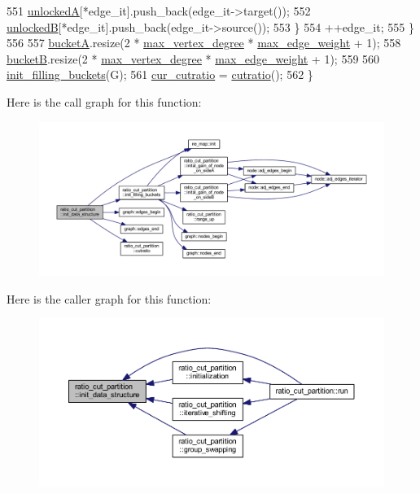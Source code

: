 \begin{DoxyCode}
551         \mbox{\hyperlink{classratio__cut__partition_a9e4d0ba86475bd0faa98e01c6be4dde0}{unlockedA}}[*edge\_it].push\_back(edge\_it->target());
552         \mbox{\hyperlink{classratio__cut__partition_af7c877d8c6e9b533ab34cde1c6690b25}{unlockedB}}[*edge\_it].push\_back(edge\_it->source());
553     \}
554     ++edge\_it;
555     \}
556 
557     \mbox{\hyperlink{classratio__cut__partition_ac9c2f4f99e1042d69f44c1a1f79d4a2f}{bucketA}}.resize(2 * \mbox{\hyperlink{classratio__cut__partition_ab07041983ab24ac059e8c98192c146e4}{max\_vertex\_degree}} * 
      \mbox{\hyperlink{classratio__cut__partition_a74193c82e8dc7d997780613378919106}{max\_edge\_weight}} + 1);
558     \mbox{\hyperlink{classratio__cut__partition_a68f6fa1360b848a0a046e1adf3827f05}{bucketB}}.resize(2 * \mbox{\hyperlink{classratio__cut__partition_ab07041983ab24ac059e8c98192c146e4}{max\_vertex\_degree}} * 
      \mbox{\hyperlink{classratio__cut__partition_a74193c82e8dc7d997780613378919106}{max\_edge\_weight}} + 1);
559 
560     \mbox{\hyperlink{classratio__cut__partition_a19fc538dbdaf8b1e0810a5bcde348c38}{init\_filling\_buckets}}(G);
561     \mbox{\hyperlink{classratio__cut__partition_a9dad324884cef5bcdd50122fc98e0860}{cur\_cutratio}} = \mbox{\hyperlink{classratio__cut__partition_a0adcba3c7847fcb62b607eebc334c503}{cutratio}}();
562 \}
\end{DoxyCode}
Here is the call graph for this function\+:\nopagebreak
\begin{figure}[H]
\begin{center}
\leavevmode
\includegraphics[width=350pt]{classratio__cut__partition_a53b8ad2845ed39cc2677721c747bdce6_cgraph}
\end{center}
\end{figure}
Here is the caller graph for this function\+:\nopagebreak
\begin{figure}[H]
\begin{center}
\leavevmode
\includegraphics[width=350pt]{classratio__cut__partition_a53b8ad2845ed39cc2677721c747bdce6_icgraph}
\end{center}
\end{figure}
